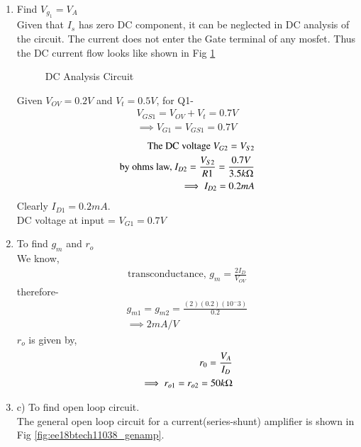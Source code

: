 \begin{enumerate}[label=\arabic*.,ref=\theenumi]
\item Find $V_{g_1} = V_A$\\
\solution Given that $I_{s}$ has zero DC component, it can be neglected in DC analysis of the circuit. The current does not enter the Gate terminal of any mosfet. Thus the DC current flow looks like shown in Fig \ref{fig:ee18btech11038_dcckt} 

\begin{figure}[!ht]
	\begin{center}
		
		\resizebox{\columnwidth}{!}{}
	\end{center}
\caption{DC Analysis Circuit}
\label{fig:ee18btech11038_dcckt}
\end{figure}

Given $V_{OV} = 0.2V$ and  $V_{t} = 0.5V$, for Q1-
\begin{align}
    V_{GS1} = V_{OV}  + V_{t} = 0.7V\\
    \implies V_{G1} = V_{GS1} = 0.7V
    \end{align}
\begin{align}
    \text{The DC voltage } V_{G2} = V_{S2}\\
    \text{by ohms law, } I_{D2} = \frac{V_{S2}}{R{1}} = \frac{0.7V}{3.5k\ohm}\\
    \implies I_{D2} = 0.2mA
\end{align}
Clearly $I_{D1} = 0.2mA$.
\\
DC voltage at input = $V_{G1} = 0.7V$
\item To find $g_{m}$ and $r_{o}$\\
\solution We know,
\begin{align}
    \text{transconductance, } g_{m} = \frac{2I_{D}}{V_{OV}} 
\end{align}
therefore-
\begin{align}
    g_{m1} = g_{m2} = \frac{(2)(0.2)(10^-3)}{0.2}\\
    \implies 2mA/V
\end{align}
$r_{o}$ is given by,
\begin{align}
    r_{0} = \frac{V_{A}}{I_{D}}\\
    \implies r_{o1} = r_{o2} = 50k\ohm
\end{align}

\item c) To find open loop circuit.\\
\solution The general open loop circuit for a current(series-shunt) amplifier is shown in Fig \ref{fig:ee18btech11038_genamp}.


\end{enumerate}
